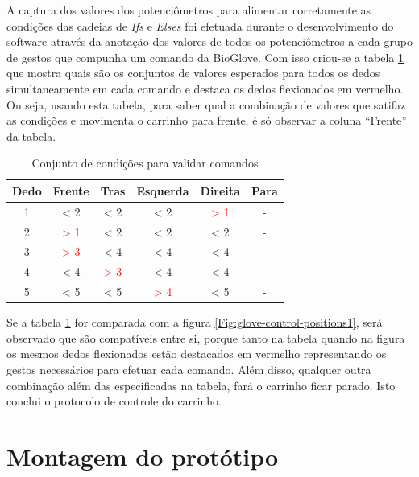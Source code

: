 \documentclass[
	12pt,				%
	openright,			%
	oneside,			%
	a4paper,			%
	english,			%
	brazil				%
	]{abntex2}
\begin{document}
		A captura dos valores dos potenciômetros para alimentar corretamente as condições das cadeias de \textit{Ifs} e \textit{Elses} foi efetuada durante o desenvolvimento do software através da anotação dos valores de todos os potenciômetros a cada grupo de gestos que compunha um comando da BioGlove. Com isso criou-se a tabela \ref{Tab:dedos-e-comandos1} que mostra quais são os conjuntos de valores esperados para todos os dedos simultaneamente em cada comando e destaca os dedos flexionados em vermelho. Ou seja, usando esta tabela, para saber qual a combinação de valores que satifaz as condições e movimenta o carrinho para frente, é só observar a coluna ``Frente'' da tabela. 

		\begin{table}[H]
     \centering
     \caption{Conjunto de condições para validar comandos}
     \begin{tabular}{c|ccccc}
			 \midrule
			 Dedo &       Frente			 & 				Tras				& 		Esquerda			 & 		Direita					& Para	\\
			 \midrule
			 1    & < 2   						 & < 2   							& < 2    						 &\textcolor{red}{> 1}&	-			\\
			 2    &\textcolor{red}{> 1}& < 2   							& < 2  	 						 & < 2   							&	-			\\
			 3    &\textcolor{red}{> 3}& < 4   							& < 4   						 & < 4   							&	-			\\
			 4    & < 4   						 &\textcolor{red}{> 3}& < 4 							 & < 4   							&	-			\\
			 5    & < 5   						 & < 5   							&\textcolor{red}{> 4}& < 5   							&	-			\\
			 \midrule
     \end{tabular}
     \label{Tab:dedos-e-comandos1}
   \end{table}

		Se a tabela \ref{Tab:dedos-e-comandos1} for comparada com a figura \ref{Fig:glove-control-positions1}, será observado que são compatíveis entre si, porque tanto na tabela quando na figura os mesmos dedos flexionados estão destacados em vermelho representando os gestos necessários para efetuar cada comando. Além disso, qualquer outra combinação além das especificadas na tabela, fará o carrinho ficar parado. Isto conclui o protocolo de controle do carrinho.



		\section{Montagem do protótipo}
\end{document}
